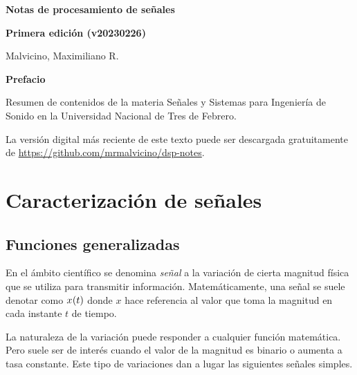 \documentclass[a5paper,12pt,twoside]{book}
\begin{document}
\pagestyle{fancy}
\fancyhf{}
\chead{\scriptsize \nouppercase\rightmark}
\cfoot{\scriptsize \thepage}
\renewcommand{\headrulewidth}{0pt}

\frontmatter
% 

\begin{center}
    \begin{Huge}
        \textbf{Notas de procesamiento de señales}
    \end{Huge}

    \vspace{1cm}
    \textbf{Primera edición (v20230226)}
    \vspace{2cm}

    \begin{Large}
        Malvicino, Maximiliano R.
    \end{Large}
\end{center}

\clearpage
\noindent
\textbf{Prefacio}

Resumen de contenidos de la materia Señales y Sistemas para Ingeniería de Sonido en la Universidad Nacional de Tres de Febrero.

La versión digital más reciente de este texto puede ser descargada gratuitamente de \url{https://github.com/mrmalvicino/dsp-notes}.

\renewcommand{\spanishappendixname}{Anexo}
\tableofcontents

\mainmatter
{}


\chapter{Caracterización de señales}


\section{Funciones generalizadas}

En el ámbito científico se denomina \emph{señal} a la variación de cierta magnitud física que se utiliza para transmitir información. Matemáticamente, una señal se suele denotar como $\fx[x]{t}$ donde $x$ hace referencia al valor que toma la magnitud en cada instante $t$ de tiempo.

La naturaleza de la variación puede responder a cualquier función matemática. Pero suele ser de interés cuando el valor de la magnitud es binario o aumenta a tasa constante. Este tipo de variaciones dan a lugar las siguientes señales simples.
\end{document}
